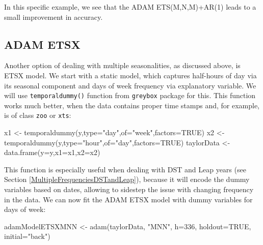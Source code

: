 \documentclass[
]{book}
\newenvironment{Shaded}{\begin{snugshade}}{\end{snugshade}}
\newcommand{\AttributeTok}[1]{\textcolor[rgb]{0.77,0.63,0.00}{#1}}
\newcommand{\ConstantTok}[1]{\textcolor[rgb]{0.00,0.00,0.00}{#1}}
\newcommand{\DecValTok}[1]{\textcolor[rgb]{0.00,0.00,0.81}{#1}}
\newcommand{\FunctionTok}[1]{\textcolor[rgb]{0.00,0.00,0.00}{#1}}
\newcommand{\NormalTok}[1]{#1}
\newcommand{\OtherTok}[1]{\textcolor[rgb]{0.56,0.35,0.01}{#1}}
\newcommand{\StringTok}[1]{\textcolor[rgb]{0.31,0.60,0.02}{#1}}
\theoremstyle{definition}
\theoremstyle{definition}
\theoremstyle{definition}
\theoremstyle{definition}
\theoremstyle{remark}
\begin{document}
In this specific example, we see that the ADAM ETS(M,N,M)+AR(1) leads to a small improvement in accuracy.

\hypertarget{adam-etsx}{%
\subsection{ADAM ETSX}\label{adam-etsx}}

Another option of dealing with multiple seasonalities, as discussed above, is ETSX model. We start with a static model, which captures half-hours of day via its seasonal component and days of week frequency via explanatory variable. We will use \texttt{temporaldummy()} function from \texttt{greybox} package for this. This function works much better, when the data contains proper time stamps and, for example, is of class \texttt{zoo} or \texttt{xts}:

\begin{Shaded}
\begin{Highlighting}[]
\NormalTok{x1 }\OtherTok{\textless{}{-}} \FunctionTok{temporaldummy}\NormalTok{(y,}\AttributeTok{type=}\StringTok{"day"}\NormalTok{,}\AttributeTok{of=}\StringTok{"week"}\NormalTok{,}\AttributeTok{factors=}\ConstantTok{TRUE}\NormalTok{)}
\NormalTok{x2 }\OtherTok{\textless{}{-}} \FunctionTok{temporaldummy}\NormalTok{(y,}\AttributeTok{type=}\StringTok{"hour"}\NormalTok{,}\AttributeTok{of=}\StringTok{"day"}\NormalTok{,}\AttributeTok{factors=}\ConstantTok{TRUE}\NormalTok{)}
\NormalTok{taylorData }\OtherTok{\textless{}{-}} \FunctionTok{data.frame}\NormalTok{(}\AttributeTok{y=}\NormalTok{y,}\AttributeTok{x1=}\NormalTok{x1,}\AttributeTok{x2=}\NormalTok{x2)}
\end{Highlighting}
\end{Shaded}

This function is especially useful when dealing with DST and Leap years (see Section \ref{MultipleFrequenciesDSTandLeap}), because it will encode the dummy variables based on dates, allowing to sidestep the issue with changing frequency in the data. We can now fit the ADAM ETSX model with dummy variables for days of week:

\begin{Shaded}
\begin{Highlighting}[]
\NormalTok{adamModelETSXMNN }\OtherTok{\textless{}{-}} \FunctionTok{adam}\NormalTok{(taylorData, }\StringTok{"MNN"}\NormalTok{, }\AttributeTok{h=}\DecValTok{336}\NormalTok{, }\AttributeTok{holdout=}\ConstantTok{TRUE}\NormalTok{,}
                         \AttributeTok{initial=}\StringTok{"back"}\NormalTok{)}
\end{Highlighting}
\end{Shaded}
\end{document}
